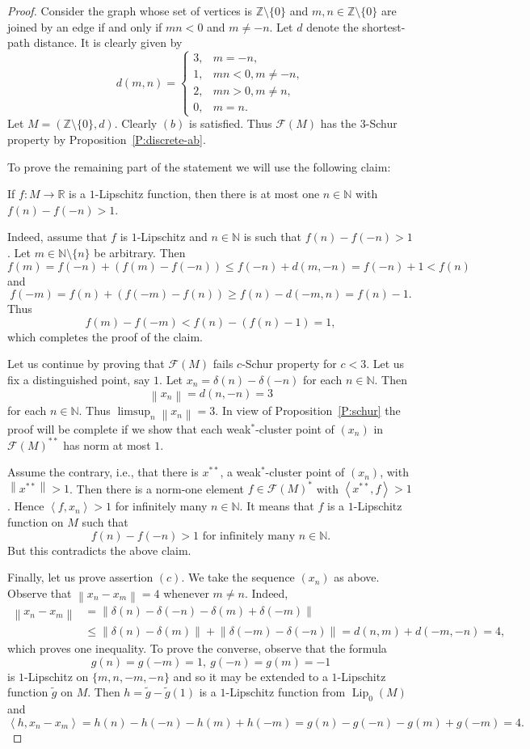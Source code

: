 \documentclass{amsart}
\numberwithin{equation}{section}
\theoremstyle{definition}
\def\F{\mathcal F}
\def\en{\mathbb N}
\def\er{\mathbb R}
\def\zet{\mathbb Z}
\def \Lip {\operatorname{Lip}}
\def\ip#1#2{\left\langle#1,#2\right\rangle}
\newcommand{\norm}[1]{\left\|#1\right\|}
\begin{document}
\begin{proof}
Consider the graph whose set of vertices is $\zet\setminus\{0\}$ and $m,n\in \zet\setminus\{0\}$ are joined by an edge if and only if $mn<0$ and $m\ne-n$.
Let $d$ denote the shortest-path distance. It is clearly given by
$$d(m,n)=\begin{cases}
  3, & m=-n,  \\ 1, & mn<0, m\ne-n,\\ 2, & mn>0, m\ne n,\\ 0, & m=n.
\end{cases}$$
Let $M=(\zet\setminus \{0\},d)$. Clearly $(b)$ is satisfied. Thus $\F(M)$ has the $3$-Schur property by Proposition~\ref{P:discrete-ab}.

To prove the remaining part of the statement we will use the following claim:

\smallskip

 If $f:M\to\er$ is a $1$-Lipschitz function, then there is at most one $n\in\en$ with 
$f(n)-f(-n)>1$.

\smallskip

Indeed, assume that $f$ is $1$-Lipschitz and $n\in\en$ is such that $f(n)-f(-n)>1$. Let $m\in\en\setminus\{n\}$ be arbitrary. Then
$$f(m)=f(-n)+(f(m)-f(-n))\le f(-n)+d(m,-n)=f(-n)+1< f(n)$$
and
$$f(-m)=f(n)+(f(-m)-f(n))\ge f(n)-d(-m,n)=f(n)-1.$$
Thus
$$f(m)-f(-m)< f(n)-(f(n)-1)=1,$$
which completes the proof of the claim.

\smallskip

Let us continue by proving that $\F(M)$ fails $c$-Schur property for $c<3$. Let us fix a distinguished point, say $1$. Let
$x_n=\delta(n)-\delta(-n)$ for each $n\in \en$. Then
$$\norm{x_n}=d(n,-n)=3$$
for each $n\in\en$. Thus $\limsup_n\norm{x_n}=3$. In view of Proposition~\ref{P:schur} the proof will be complete if we show that each weak$^*$-cluster point of $(x_n)$ in $\F(M)^{**}$ has norm at most $1$.

Assume the contrary, i.e., that there is $x^{**}$, a weak$^*$-cluster point of $(x_n)$, with $\norm{x^{**}}>1$. 
Then there is a norm-one element $f\in \F(M)^*$ with $\ip{x^{**}}{f}>1$. Hence $\ip{f}{x_n}>1$ for infinitely many $n\in\en$. It means that $f$ is a $1$-Lipschitz function on $M$ such that
$$f(n)-f(-n)>1\mbox{ for infinitely many }n\in\en.$$
But this contradicts the above claim.

\smallskip

Finally, let us prove assertion $(c)$. We take the sequence $(x_n)$ as above. Observe that $\norm{x_n-x_m}=4$ whenever $m\ne n$. Indeed, 
$$\begin{aligned}
    \norm{x_n-x_m}&=\norm{\delta(n)-\delta(-n)-\delta(m)+\delta(-m)}\\&\le \norm{\delta(n)-\delta(m)}+\norm{\delta(-m)-\delta(-n)}=d(n,m)+d(-m,-n)=4,\end{aligned}$$
which proves one inequality. To prove the converse, observe that the formula
$$g(n)=g(-m)=1,\ g(-n)=g(m)=-1$$
is $1$-Lipschitz on $\{m,n,-m,-n\}$ and so it may be extended to a $1$-Lipschitz function $\widetilde{g}$ on $M$. 
Then $h=\widetilde{g}-\widetilde{g}(1)$ is a $1$-Lipschitz function from $\Lip_0(M)$ and
$$\ip{h}{x_n-x_m}=h(n)-h(-n)-h(m)+h(-m)=g(n)-g(-n)-g(m)+g(-m)=4.$$


\end{proof}
\end{document}
